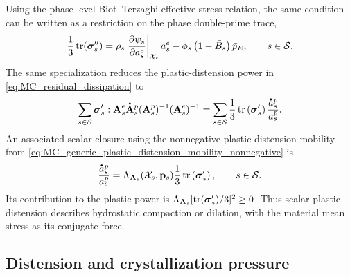 %
Using the phase-level Biot--Terzaghi effective-stress relation, the same
condition can be written as a
restriction on the phase double-prime trace,
%
\begin{equation}
	\frac{1}{3}\operatorname{tr}(\boldsymbol{\sigma}_s^{\prime\prime})
	=
	\rho_s
	\left.
	\frac{\partial \psi_s}{\partial a_s^e}
	\right\vert_{\mathcal{X}_s}
	a_s^e
	-\phi_s\left(1-\bar B_s\right)\bar p_E,
	\qquad
	s\in\mathcal{S} .
	\label{eq:MC_scalar_double_prime_distension_trace}
\end{equation}
%
The same specialization reduces the plastic-distension power in
\eqref{eq:MC_residual_dissipation} to
%
\begin{equation}
	\sum_{s\in\mc S}
	\bs\sigma_s':
	\mbf A_s^e\phasedot{\mbf A}_s^p
	(\mbf A_s^p)^{-1}(\mbf A_s^e)^{-1}
	=
	\sum_{s\in\mc S}
	\frac{1}{3}\operatorname{tr}\left(
	\bs\sigma_s'
	\right)
	\frac{\phasedot{a}_s^p}{a_s^p}.
	\label{eq:MC_scalar_plastic_distension_power}
\end{equation}
%
An associated scalar closure using the nonnegative plastic-distension mobility
from \eqref{eq:MC_generic_plastic_distension_mobility_nonnegative} is
%
\begin{equation}
	\frac{\phasedot a_s^p}{a_s^p}
	=
	\Lambda_{\mbf A_s}(\mc X_s,\mbf p_s)
	\frac{1}{3}\operatorname{tr}\left(
	\bs\sigma_s'
	\right),
	\qquad
	s\in\mc S .
	\label{eq:MC_scalar_plastic_distension_flow_rule}
\end{equation}
%
Its contribution to the plastic power is
\(\Lambda_{\mathbf{A}_s}
[\operatorname{tr}(\boldsymbol{\sigma}_s')/3]^2\ge0\).
Thus scalar plastic distension describes hydrostatic compaction or dilation,
with the material mean stress as its conjugate force.

\subsection{Distension and crystallization pressure}
\label{sec:MC_distension_crystallization_pressure}

